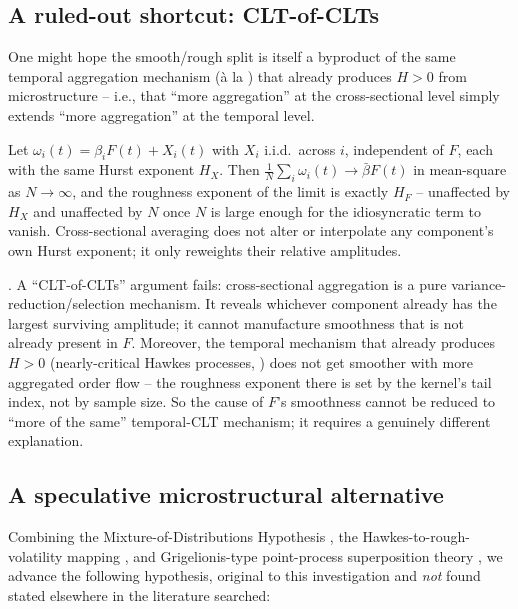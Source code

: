 \documentclass[11pt]{article}
\begin{document}
\subsection{A ruled-out shortcut: CLT-of-CLTs}

One might hope the smooth/rough split is itself a byproduct of the same temporal aggregation mechanism (\`a la \citealp{eleuch2018microstructural}) that already produces $H>0$ from microstructure -- i.e., that ``more aggregation'' at the cross-sectional level simply extends ``more aggregation'' at the temporal level.

\begin{proposition}
Let $\omega_i(t) = \beta_i F(t) + X_i(t)$ with $X_i$ i.i.d.\ across $i$, independent of $F$, each with the same Hurst exponent $H_X$. Then $\frac1N\sum_i \omega_i(t) \to \bar\beta F(t)$ in mean-square as $N\to\infty$, and the roughness exponent of the limit is exactly $H_F$ -- unaffected by $H_X$ and unaffected by $N$ once $N$ is large enough for the idiosyncratic term to vanish. Cross-sectional averaging does not alter or interpolate any component's own Hurst exponent; it only reweights their relative amplitudes.
\end{proposition}

\begin{finding}
. A ``CLT-of-CLTs'' argument fails: cross-sectional aggregation is a pure variance-reduction/selection mechanism. It reveals whichever component already has the largest surviving amplitude; it cannot manufacture smoothness that is not already present in $F$. Moreover, the temporal mechanism that already produces $H>0$ (nearly-critical Hawkes processes, \citealp{eleuch2018microstructural}) does not get smoother with more aggregated order flow -- the roughness exponent there is set by the kernel's tail index, not by sample size. So the cause of $F$'s smoothness cannot be reduced to ``more of the same'' temporal-CLT mechanism; it requires a genuinely different explanation.
\end{finding}

\subsection{A speculative microstructural alternative}

Combining the Mixture-of-Distributions Hypothesis \citep{clark1973subordinated}, the Hawkes-to-rough-volatility mapping \citep{eleuch2018microstructural,jaisson2016rough}, and Grigelionis-type point-process superposition theory \citep{grigelionis1963}, we advance the following hypothesis, original to this investigation and \emph{not} found stated elsewhere in the literature searched:
\end{document}
